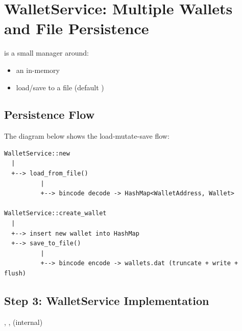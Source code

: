 \section{WalletService: Multiple Wallets and File Persistence}
\label{sec:wallet-service}

 is a small manager around:

\begin{itemize}
  \item an in-memory 
  \item load/save to a file (default )
\end{itemize}

\subsection{Persistence Flow}
\label{sec:persistence-flow}

The diagram below shows the load-mutate-save flow:

\begin{verbatim}
WalletService::new
  |
  +--> load_from_file()
          |
          +--> bincode decode -> HashMap<WalletAddress, Wallet>

WalletService::create_wallet
  |
  +--> insert new wallet into HashMap
  +--> save_to_file()
          |
          +--> bincode encode -> wallets.dat (truncate + write + flush)
\end{verbatim}

\subsection{Step 3: WalletService Implementation}
\label{sec:wallet-service-impl}

\begin{infobox}
, ,  (internal)
\end{infobox}

